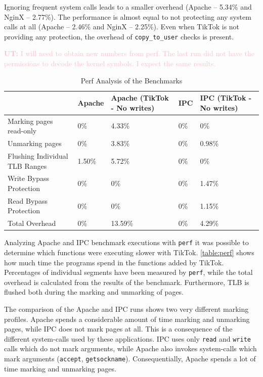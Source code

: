 \documentclass[conference]{IEEEtran}
\newcommand{\uros}[1]{\textcolor{pink}{\textbf{UT:} #1}}
\newcommand{\sysname}{TikTok}
\begin{document}
Ignoring frequent system calls leads to a smaller overhead (Apache -- 5.34\% and
NginX -- 2.77\%). The performance is almost equal to not protecting any system
calls at all (Apache -- 2.46\% and NginX -- 2.25\%). Even when \sysname
is not providing any protection, the overhead of \texttt{copy\_to\_user} checks
is present.

\uros{I will need to obtain new numbers from perf. The last run did not have the
permissions to decode the kernel symbols. I expect the same results.}

\begin{table}[]
  \label{table:perf}
  \centering
  \begin{tabular}{|l|l|l|l|l|}
  \hline
                                 & Apache & Apache (\sysname{} - No writes) & IPC & IPC (\sysname{} - No writes)\\ \hline
  Marking pages read-only        & 0\%    & 4.33\%          & 0\% & 0\%         \\ \hline
  Unmarking pages                & 0\%    & 3.83\%          & 0\% & 0.98\%      \\ \hline
  Flushing Individual TLB Ranges & 1.50\% & 5.72\%          & 0\% & 0\%         \\ \hline
  Write Bypass Protection        & 0\%    & 0\%             & 0\% & 1.47\%      \\ \hline
  Read Bypass Protection         & 0\%    & 0\%             & 0\% & 1.15\%      \\ \hline
  Total Overhead                 & 0\%    & 13.59\%         & 0\% & 4.29\%      \\ \hline
  \end{tabular}
  \caption{Perf Analysis of the Benchmarks}
\end{table}

Analyzing Apache and IPC benchmark executions with \texttt{perf} it was possible
to determine which functions were executing slower with \sysname{}.
\autoref{table:perf} shows how much time the programs spend in the functions
added by \sysname. Percentages of individual segments have been measured by
\texttt{perf}, while the total overhead is calculated from the results of the
benchmark. Furthermore, TLB is flushed both during the marking and unmarking of
pages.

The comparison of the Apache and IPC runs shows two very different marking
profiles. Apache spends a considerable amount of time marking and unmarking
pages, while IPC does not mark pages at all. This is a consequence of the
different system-calls used by these applications. IPC uses only \texttt{read}
and \texttt{write} calls which do not mark arguments, while Apache also invokes
system-calls which mark arguments (\texttt{accept}, \texttt{getsockname}).
Consequentially, Apache spends a lot of time marking and unmarking pages.
\end{document}
